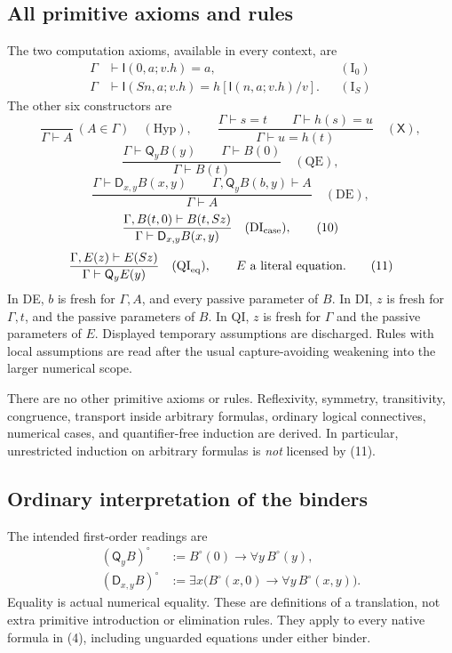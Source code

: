 \documentclass[11pt,letterpaper]{article}
\theoremstyle{definition}\newtheorem{definition}[theorem]{Definition}
\theoremstyle{remark}\newtheorem{remark}[theorem]{Remark}
\newcommand{\Q}{\mathsf Q}
\newcommand{\D}{\mathsf D}
\newcommand{\I}{\mathsf I}
\newcommand{\One}{\mathsf X}
\begin{document}
\subsection{All primitive axioms and rules}
The two computation axioms, available in every context, are
\begin{align}
 \Gamma&\vdash\I(0,a;v.h)=a, &&(\mathrm I_0)\tag{5}\label{eq:i0}\\
 \Gamma&\vdash\I(Sn,a;v.h)=h[\I(n,a;v.h)/v].
 &&(\mathrm I_S)\tag{6}\label{eq:is}
\end{align}
The other six constructors are
\[
 \frac{}{\Gamma\vdash A}\ (A\in\Gamma)\quad(\mathrm{Hyp}),
 \qquad
 \frac{\Gamma\vdash s=t\qquad\Gamma\vdash h(s)=u}
      {\Gamma\vdash u=h(t)}\quad(\One),
 \tag{7}
\]
\[
 \frac{\Gamma\vdash\Q_yB(y)\qquad\Gamma\vdash B(0)}
      {\Gamma\vdash B(t)}\quad(\mathrm{QE}),
 \tag{8}
\]
\[
 \frac{\Gamma\vdash\D_{x,y}B(x,y)\qquad
       \Gamma,\Q_yB(b,y)\vdash A}
      {\Gamma\vdash A}\quad(\mathrm{DE}),
 \tag{9}
\]
\[
 \frac{\Gamma,B(t,0)\vdash B(t,Sz)}
      {\Gamma\vdash\D_{x,y}B(x,y)}\quad(\mathrm{DI}_{\rm case}),
 \tag{10}
\]
\[
 \frac{\Gamma,E(z)\vdash E(Sz)}
      {\Gamma\vdash\Q_yE(y)}\quad(\mathrm{QI}_{\rm eq}),
 \qquad E\text{ a literal equation}.
 \tag{11}
\]
In DE, \(b\) is fresh for \(\Gamma,A\), and every passive parameter of
\(B\). In DI, \(z\) is fresh for \(\Gamma,t\), and the passive parameters
of \(B\). In QI, \(z\) is fresh for \(\Gamma\) and the passive parameters
of \(E\). Displayed temporary assumptions are discharged. Rules with
local assumptions are read after the usual capture-avoiding weakening
into the larger numerical scope.

There are no other primitive axioms or rules. Reflexivity, symmetry,
transitivity, congruence, transport inside arbitrary formulas, ordinary
logical connectives, numerical cases, and quantifier-free induction are
derived. In particular, unrestricted induction on arbitrary formulas is
\emph{not} licensed by (11).

\subsection{Ordinary interpretation of the binders}
The intended first-order readings are
\begin{align*}
 (\Q_y B)^\circ&:=B^\circ(0)\to\forall y\,B^\circ(y),\\
 (\D_{x,y}B)^\circ&:=\exists x\bigl(B^\circ(x,0)\to
                            \forall y\,B^\circ(x,y)\bigr).
\end{align*}
Equality is actual numerical equality. These are definitions of a
translation, not extra primitive introduction or elimination rules.
They apply to every native formula in (4), including unguarded equations
under either binder.
\end{document}
